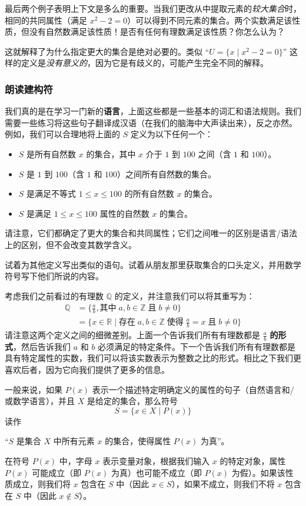 最后两个例子表明上下文是多么的重要。当我们更改从中提取元素的\emph{较大集合}时，相同的共同属性（满足 $x^2 -2 = 0$）可以得到不同元素的集合。两个实数满足该性质，但没有自然数满足该性质！是否有任何有理数满足该性质？你怎么认为？

这就解释了为什么指定更大的集合是绝对必要的。类似 ``$U = \{x \mid x^2 - 2 = 0\}$'' 这样的定义是\emph{没有意义的}，因为它是有歧义的，可能产生完全不同的解释。

\subsubsection*{朗读建构符}

我们真的是在学习一门新的\textbf{语言}，上面这些都是一些基本的词汇和语法规则。我们需要一些练习将这些句子翻译成汉语（在我们的脑海中大声读出来），反之亦然。例如，我们可以合理地将上面的 $S$ 定义为以下任何一个：

\begin{itemize}
    \item $S$ 是所有自然数 $x$ 的集合，其中 $x$ 介于 $1$ 到 $100$ 之间（含 $1$ 和 $100$）。
    \item $S$ 是 $1$ 到 $100$（含 $1$ 和 $100$）之间所有自然数的集合。
    \item $S$ 是满足不等式 $1 \le x \le 100$ 的所有自然数 $x$ 的集合。
    \item $S$ 是满足 $1 \le x \le 100$ 属性的自然数 $x$ 的集合。
\end{itemize}
请注意，它们都确定了更大的集合和共同属性；它们之间唯一的区别是语言/语法上的区别，但不会改变其数学含义。

试着为其他定义写出类似的语句。试着从朋友那里获取集合的口头定义，并用数学符号写下他们所说的内容。

考虑我们之前看过的有理数 $\mathbb{Q}$ 的定义，并注意我们可以将其重写为：
\begin{align*}
    \mathbb{Q} &= \Big\{\frac{a}{b}, \text{其中}\; a,b \in \mathbb{Z} \;\text{且}\; b \ne 0\Big\}\\
               &= \Big\{x \in \mathbb{R} \mid \text{存在}\; a, b \in \mathbb{Z} \;\text{使得}\; \frac{a}{b}= x \;\text{且}\; b \ne 0\Big\}
\end{align*}
请注意这两个定义之间的细微差别。上面一个告诉我们所有有理数都是 $\frac{a}{b}$ \textbf{的形式}，然后告诉我们 $a$ 和 $b$ 必须满足的特定条件。下一个告诉我们所有有理数都是具有特定属性的实数，我们可以将该实数表示为整数之比的形式。相比之下我们更喜欢后者，因为它向我们提供了更多的信息。

一般来说，如果 $P(x)$ 表示一个描述特定明确定义的属性的句子（自然语言和/或数学语言），并且 $X$ 是给定的集合，那么符号
\[S = \{x \in X \mid P(x)\}\]
读作
\begin{center}``$S$ 是集合 $X$ 中所有元素 $x$ 的集合，使得属性 $P(x)$ 为真''。\end{center}
在符号 $P(x)$ 中，字母 $x$ 表示变量对象，根据我们输入 $x$ 的特定对象，属性 $P(x)$ 可能成立（即 $P(x)$ 为真）也可能不成立（即 $P (x)$ 为假）。如果该性质成立，则我们将 $x$ 包含在 $S$ 中（因此 $x \in S$），如果不成立，则我们不将 $x$ 包含在 $S$ 中（因此 $x \notin S$）。

